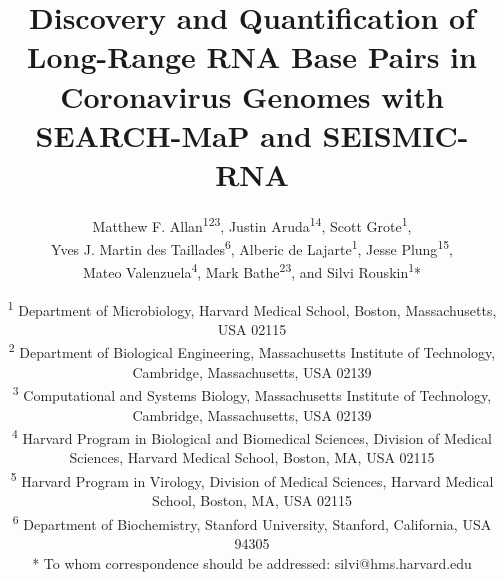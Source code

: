 \documentclass[12pt,a4paper]{article}
\title{Discovery and Quantification of Long-Range RNA Base Pairs in Coronavirus Genomes with SEARCH-MaP and SEISMIC-RNA}
\author{Matthew F. Allan\textsuperscript{123}, Justin Aruda\textsuperscript{14}, Scott Grote\textsuperscript{1}, \\ Yves J. Martin des Taillades\textsuperscript{6}, Alberic de Lajarte\textsuperscript{1}, Jesse Plung\textsuperscript{15}, \\ Mateo Valenzuela\textsuperscript{4}, Mark Bathe\textsuperscript{23}, and Silvi Rouskin\textsuperscript{1}*}
\date{
	\textsuperscript{1} Department of Microbiology, Harvard Medical School, Boston, Massachusetts, USA 02115 \\
	\textsuperscript{2} Department of Biological Engineering, Massachusetts Institute of Technology, Cambridge, Massachusetts, USA 02139 \\
	\textsuperscript{3} Computational and Systems Biology, Massachusetts Institute of Technology, Cambridge, Massachusetts, USA 02139 \\
	\textsuperscript{4} Harvard Program in Biological and Biomedical Sciences, Division of Medical Sciences, Harvard Medical School, Boston, MA, USA 02115 \\
	\textsuperscript{5} Harvard Program in Virology, Division of Medical Sciences, Harvard Medical School, Boston, MA, USA 02115 \\
	\textsuperscript{6} Department of Biochemistry, Stanford University, Stanford, California, USA 94305 \\
	* To whom correspondence should be addressed: silvi@hms.harvard.edu \\
}
\begin{document}
\emergencystretch \textwidth

\maketitle
\newpage

\newpage

\newpage

\newpage

\newpage

\newpage


\newpage
\begin{singlespace}
	
	
\end{singlespace}

\newpage

\end{document}

